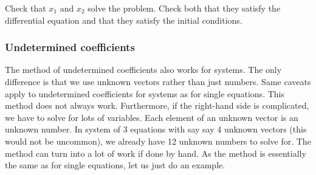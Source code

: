 \begin{exercise}
Check that $x_1$ and $x_2$ solve the problem.  Check both that they satisfy
the differential equation and that they satisfy the initial conditions.
\end{exercise}

\subsubsection{Undetermined coefficients}

The method of
undetermined coefficients also
works for systems.
The only
difference is that we use unknown vectors rather than just
numbers.  Same caveats apply to undetermined coefficients for systems
as for single equations.  This method does not always work.
Furthermore, if the right-hand side is complicated, we have to solve
for lots of
variables.  Each element of an
unknown vector is an unknown number.  In system of 3 equations with say
say 4 unknown vectors (this would not be uncommon), we already have 12
unknown numbers to solve for.
The method can turn into a lot of
work if done by hand.
As the method is essentially the same as for single equations,
let us just do an example.

